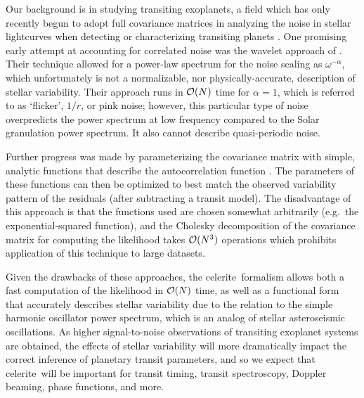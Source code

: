 \documentclass[manuscript, letterpaper]{aastex6}
\newcommand{\project}[1]{\textsf{#1}}
\newcommand{\celerite}{\project{celerite}}
\begin{document}
Our background is in studying transiting exoplanets, a field which has only
recently begun to adopt full covariance matrices in analyzing the noise in
stellar lightcurves when detecting or characterizing transiting planets
\citep[for example,][]{Gibson:2012, Barclay:2015, Evans:2015, Aigrain:2016,
Grunblatt:2016, Luger:2016}.
One promising early attempt at accounting for correlated noise was the wavelet
approach of \citet{Carter:2009}.
Their technique allowed for a power-law spectrum for the noise scaling as
$\omega^{-\alpha}$, which unfortunately is not a normalizable, nor
physically-accurate, description of stellar variability.
Their approach runs in ${\cal O}(N)$ time for $\alpha=1$, which is referred to
as `flicker', $1/r$, or pink noise;  however, this particular type of noise
overpredicts the power spectrum at low frequency compared to the Solar
granulation power spectrum.  It also cannot describe quasi-periodic noise.

Further progress was made by parameterizing the covariance matrix with simple,
analytic functions that describe the autocorrelation function \citep{Gibson:2012}.
The parameters of these functions can then be optimized to best match the observed
variability pattern of the residuals (after subtracting a transit model).  The
disadvantage of this approach is that the functions used are chosen somewhat
arbitrarily (e.g.\ the exponential-squared function), and the Cholesky decomposition
of the covariance matrix for computing the likelihood takes ${\cal O}(N^3)$ operations
which prohibits application of this technique to large datasets.

Given the drawbacks of these approaches, the \celerite\ formalism allows both a fast
computation of the likelihood in ${\cal O}(N)$ time, as well as a functional form
that accurately describes stellar variability due to the relation to the simple
harmonic oscillator power spectrum, which is an analog of stellar asteroseismic
oscillations.  As higher signal-to-noise observations of transiting exoplanet systems
are obtained, the effects of stellar variability will more dramatically impact the
correct inference of planetary transit parameters, and so we expect that \celerite\
will be important for transit timing, transit spectroscopy, Doppler beaming,
phase functions, and more.
\end{document}

